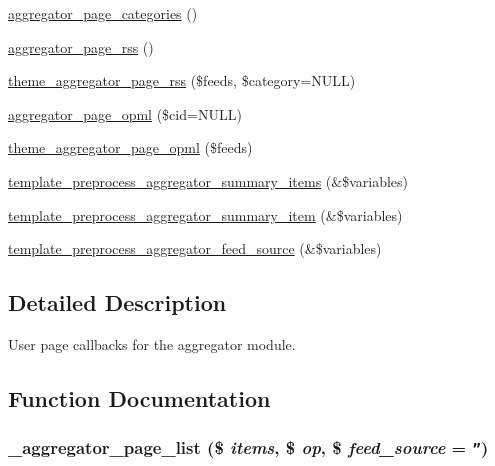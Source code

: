 \begin{CompactItemize}
\item 
\hyperlink{aggregator_8pages_8inc_180a110c19ebe4eeaacaa61aff7b42e5}{aggregator\_\-page\_\-categories} ()
\item 
\hyperlink{aggregator_8pages_8inc_94deaf11e3e859a3c338a74191120a37}{aggregator\_\-page\_\-rss} ()
\item 
\hyperlink{group__themeable_g5a282bbb141cbf28b7aee12b14a74bf5}{theme\_\-aggregator\_\-page\_\-rss} (\$feeds, \$category=NULL)
\item 
\hyperlink{aggregator_8pages_8inc_8d85211ae223530fc56bad7caf9a9b5d}{aggregator\_\-page\_\-opml} (\$cid=NULL)
\item 
\hyperlink{group__themeable_gbafd2e326445cab10147eacd65c1c023}{theme\_\-aggregator\_\-page\_\-opml} (\$feeds)
\item 
\hyperlink{aggregator_8pages_8inc_f80643fa6f8b742a431aed61576606dd}{template\_\-preprocess\_\-aggregator\_\-summary\_\-items} (\&\$variables)
\item 
\hyperlink{aggregator_8pages_8inc_b60386a469193731ad719534bcdcac56}{template\_\-preprocess\_\-aggregator\_\-summary\_\-item} (\&\$variables)
\item 
\hyperlink{aggregator_8pages_8inc_06bc89c22bcd3b3c70c9c1d19391aefc}{template\_\-preprocess\_\-aggregator\_\-feed\_\-source} (\&\$variables)
\end{CompactItemize}


\subsection{Detailed Description}
User page callbacks for the aggregator module. 

\subsection{Function Documentation}
\hypertarget{aggregator_8pages_8inc_825e07217628ea623b6392c5a38d94f6}{
\subsubsection[{\_\-aggregator\_\-page\_\-list}]{\setlength{\rightskip}{0pt plus 5cm}\_\-aggregator\_\-page\_\-list (\$ {\em items}, \/  \$ {\em op}, \/  \$ {\em feed\_\-source} = {\tt ''})}}
\label{aggregator_8pages_8inc_825e07217628ea623b6392c5a38d94f6}


